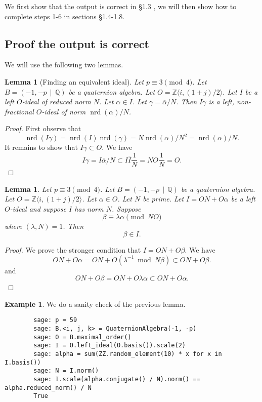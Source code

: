 \documentclass[10pt]{article}
\theoremstyle{plain}
\newtheorem{lemma}[theorem]{Lemma}
\theoremstyle{definition}
\newtheorem{example}[theorem]{Example}
\newcommand{\op}{\operatorname}
\newcommand{\Z}{\mathbb{Z}}
\newcommand{\Q}{\mathbb{Q}}
\newcommand{\nrd}{\op{nrd}}
\begin{document}
We first show that the output is correct in \S 1.3 , we will then show how to complete steps 1-6 in sections \S 1.4-1.8.

\subsection{Proof the output is correct}
We will use the following two lemmas.
\begin{lemma}[Finding an equivalent ideal] \label{lem: change norm}
    Let \( p \equiv 3 \pmod{4} \).
    Let \( B =  (-1, -p \, \mid \, \Q) \) be a quaternion algebra.
    Let \( O = \Z \langle i, (1+j) / 2 \rangle \).
    Let \( I \) be a left \( O \)-ideal of reduced norm \( N \).
    Let \( \alpha \in I \).
    Let \( \gamma = \overline{\alpha} / N \).
    Then \( I \gamma \) is a left, non-fractional \( O \)-ideal of norm \( \nrd(\alpha) / N \).
\end{lemma}
\begin{proof}
    First observe that
    \[
        \nrd(I \gamma) = \nrd(I)\nrd(\gamma) = N \nrd(\alpha) / N^2 = \nrd(\alpha) / N.
    \]
    It remains to show that \( I\gamma \subset O \).
    We have
    \[
        I\gamma = I\overline{\alpha} / N \subset I\overline{I} \frac{1}{N} = NO \frac{1}{N} = O.
    \]
\end{proof}

\begin{lemma} \label{lem: beta in I}
    Let \( p \equiv 3 \pmod{4} \).
    Let \( B =  (-1, -p \, \mid \, \Q) \) be a quaternion algebra.
    Let \( O = \Z \langle i, (1+j) / 2 \rangle \).
    Let \( \alpha \in O \).
    Let \( N \) be prime.
    Let \( I = ON + O\alpha \) be a left \( O \)-ideal and suppose \( I \) has norm \( N \).
    Suppose
    \[
        \beta \equiv \lambda \alpha \pmod{NO}
    \]
    where \( (\lambda, N) = 1 \).
    Then
    \[
        \beta \in I.
    \]
\end{lemma}
\begin{proof}
    We prove the stronger condition that \( I = ON + O\beta \).
    We have
    \[
        ON + O\alpha
        = ON + O(\lambda^{-1} \bmod{N}\beta)
        \subset ON + O\beta .
    \]
    and
    \[
        ON + O\beta
        = ON + O\lambda \alpha
        \subset ON + O\alpha .
    \]
\end{proof}

\begin{example}
    We do a sanity check of the previous lemma.
    \begin{lstlisting}
        sage: p = 59
        sage: B.<i, j, k> = QuaternionAlgebra(-1, -p)
        sage: O = B.maximal_order()
        sage: I = O.left_ideal(O.basis()).scale(2)
        sage: alpha = sum(ZZ.random_element(10) * x for x in I.basis())
        sage: N = I.norm()
        sage: I.scale(alpha.conjugate() / N).norm() == alpha.reduced_norm() / N
        True
    \end{lstlisting}
\end{example}
\end{document}
